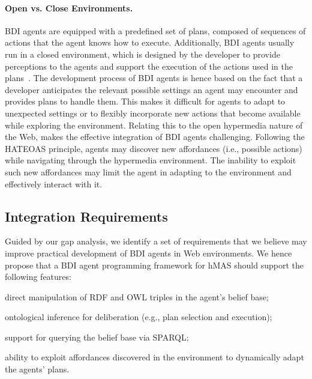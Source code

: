 \paragraph{Open vs. Close Environments.}

\ac{BDI} agents are equipped with a predefined set of plans, composed of sequences of actions that the agent knows how to execute.
%
Additionally, \ac{BDI} agents usually run in a closed environment,
which is designed by the developer to provide perceptions to the agents and
support the execution of the actions used in the plans~\cite{weyns2007aamas}.
%
The development process of \ac{BDI} agents is hence based on the fact that a developer anticipates
the relevant possible settings an agent may encounter and provides plans to handle them.
%
This makes it difficult for agents to adapt to unexpected settings or to flexibly incorporate new actions that become available while exploring the environment.
%
Relating this to the open hypermedia nature of the Web, makes the effective integration of \ac{BDI} agents challenging.
%
Following the \ac{HATEOAS} principle, agents may discover new affordances
(i.e., possible actions)
while navigating through the hypermedia environment.
%
The inability to exploit such new affordances may limit the agent in adapting to the environment and effectively interact with it.

\subsection{Integration Requirements}
\label{sec:integrating-bdi-hypermedia}

Guided by our gap analysis,
we identify a set of requirements that we believe may improve practical development of \ac{BDI} agents in Web environments.
%
We hence propose that a \ac{BDI} agent programming framework for \ac{hMAS} should support the following features:
%
\begin{enumerate*}[label=\textbf{(R\arabic*)}]
  \item direct manipulation of \ac{RDF} and \ac{OWL} triples in the agent's belief base;
  \label{req:direct}

  \item ontological inference for deliberation (e.g., plan selection and execution);
  \label{req:reasoning}

  \item support for querying the belief base via \acs{SPARQL};
  \label{req:query}

  \item ability to exploit affordances discovered in the environment to dynamically adapt the agents' plans.
  \label{req:actions}
\end{enumerate*}


